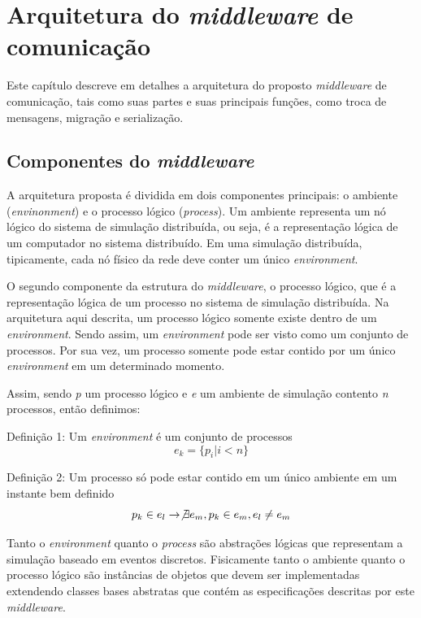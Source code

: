 \chapter{Arquitetura do \textit{middleware} de comunicação}

Este capítulo descreve em detalhes a arquitetura do proposto \textit{middleware} de comunicação, tais como suas partes e suas principais funções, como troca de mensagens, migração e serialização. 

\section{Componentes do \textit{middleware}}

A arquitetura proposta é dividida em dois componentes principais: o ambiente (\textit{envinonment}) e o processo lógico (\textit{process}). Um ambiente representa um nó lógico do sistema de simulação distribuída, ou seja, é a representação lógica de um computador no sistema distribuído. Em uma simulação distribuída, tipicamente, cada nó físico da rede deve conter um único \textit{environment}.

O segundo componente da estrutura do \textit{middleware}, o processo lógico, que é a representação lógica de um processo no sistema de simulação distribuída. Na arquitetura aqui descrita, um processo lógico somente existe dentro de um \textit{environment}. Sendo assim, um \textit{environment} pode ser visto como um conjunto de processos. Por sua vez, um processo somente pode estar contido por um único \textit{environment} em um determinado momento.

Assim, sendo \textit{p} um processo lógico e \textit{e} um ambiente de simulação contento \textit{n} processos, então definimos:

Definição 1: Um \textit{environment} é um conjunto de processos \begin{equation} e_{k} = \{p_{i} | i < n \} \end{equation}

Definição 2: Um processo só pode estar contido em um único ambiente em um instante bem definido \begin{equation} p_{k} \in e_{l} \rightarrow \not \exists e_{m}, p_{k} \in e_{m}, e_{l} \neq e_{m} \end{equation} 

Tanto o \textit{environment} quanto o \textit{process} são abstrações lógicas que representam a simulação baseado em eventos discretos. Fisicamente tanto o ambiente quanto o processo lógico são instâncias de objetos que devem ser implementadas extendendo classes bases abstratas que contém as especificações descritas por este \textit{middleware}.

